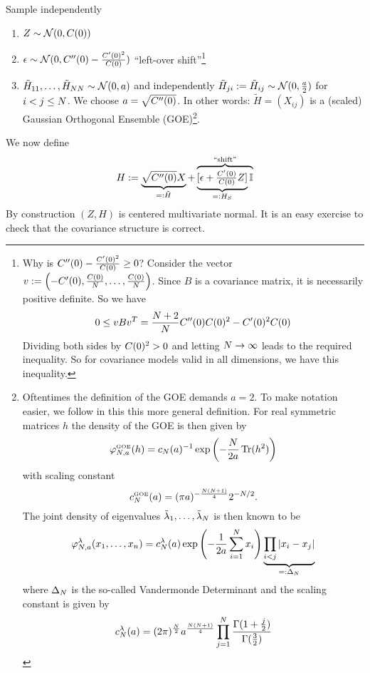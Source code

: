Sample independently
\begin{enumerate}
	\item \(Z\sim\mathcal{N}(0, C(0))\)
	\item \(\epsilon \sim \mathcal{N}(0, C''(0) - \frac{C'(0)^2}{C(0)})\)
	``left-over shift''\footnote{
		Why is \(C''(0) - \frac{C'(0)^2}{C(0)} \ge 0\)? Consider the
		vector \(v:=\left(-C'(0), \frac{C(0)}{N}, \dots,
		\frac{C(0)}{N}\right)\).  Since \(B\) is a covariance matrix, it
		is necessarily positive definite.
		So we have
		\[
			0 \le v B v^T
			= \frac{N+2}{N}C''(0)C(0)^2 - C'(0)^2C(0)
		\]
		Dividing both sides by \(C(0)^2 > 0\) and letting \(N\to\infty\)
		leads to the required inequality. So for covariance models valid in all
		dimensions, we have this inequality.
	}
	\item \(\tilde{H}_{11},\dots,\tilde{H}_{NN}\sim\mathcal{N}(0,
	a)\) and independently
	\(\tilde{H}_{ji}:=\tilde{H}_{ij}\sim\mathcal{N}(0,\frac{a}{2})\) for
	\(i<j\le N\). We choose \(a=\sqrt{C''(0)}\).
	In other words: \(\tilde{H} = (X_{ij})\) is a (scaled) Gaussian Orthogonal
	Ensemble (GOE)\footnote{
		Oftentimes the definition of the GOE demands \(a=2\). To make notation
		easier, we follow \textcite{fyodorovHighDimensionalRandomFields2013} in
		this this more general definition.
		For real symmetric matrices \(h\) the density of the GOE is then given by
		\[
			\varphi^{\text{\tiny GOE}}_{N,a}(h)
			= c_N(a)^{-1}\exp\left(-\frac{N}{2a}\operatorname{Tr}(h^2)\right)
		\]
		with scaling constant
		\[
			c^{\text{\tiny GOE}}_N(a) = (\pi a)^{-\frac{N(N+1)}{4}}2^{-N/2}.
		\]
		The joint density of eigenvalues \(\tilde{\lambda}_1,\dots,\tilde{\lambda}_N\)	
		is then known to be
		\[
			\varphi^{\lambda}_{N, a}(x_1,\dots,x_n)
			= c^{\lambda}_N(a)
			\exp\left(-\frac{1}{2a}\sum_{i=1}^N x_i\right)
			\underbrace{\prod_{i<j}|x_i - x_j|}_{=:\Delta_N}
		\]
		where \(\Delta_N\) is the so-called Vandermonde Determinant and
		the scaling constant is given by
		\[
			c^{\lambda}_N(a) = (2\pi)^{\frac{N}2}a^{\frac{N(N+1)}4}\prod_{j=1}^N \frac{\Gamma(1+\frac{j}2)}{\Gamma(\frac32)}
		\]
	}.
\end{enumerate}
We now define
\[
	H := \underbrace{\sqrt{C''(0)}X}_{=:\tilde{H}}
	+ \overbrace{\underbrace{[\epsilon + \tfrac{C'(0)}{C(0)} Z]}_{=:H_S}\mathbb{I}}^{\text{``shift''}}
\]
By construction \((Z,H)\) is centered multivariate normal. It is an easy
exercise to check that the covariance structure is correct.


